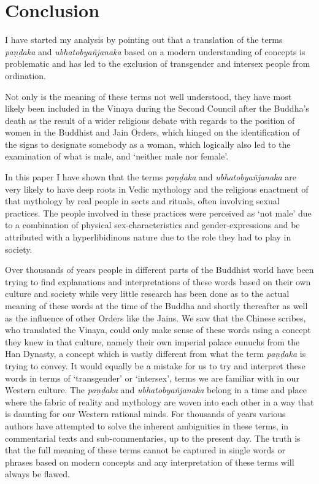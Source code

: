 \section{Conclusion}
I have started my analysis by pointing out that a translation of the terms {\em paṇḍaka} and {\em ubhatob­yañ­janaka} based on a modern understanding of concepts is problematic and has led to the exclusion of transgender and intersex people from ordination.

Not only is the meaning of these terms not well understood, they have most likely been included in the Vinaya during the Second Council after the Buddha's death as the result of a wider religious debate with regards to the position of women in the Buddhist and Jain Orders, which hinged on the identification of the signs to designate somebody as a woman, which logically also led to the examination of what is male, and `neither male nor female'.

In this paper I have shown that the terms {\em paṇḍaka} and {\em ubhatob­yañ­janaka} are very likely to have deep roots in Vedic mythology and the religious enactment of that mythology by real people in sects and rituals, often involving sexual practices. The people involved in these practices were perceived as `not male' due to a combination of physical sex-characteristics and gender-expressions and be attributed with a hyperlibidinous nature due to the role they had to play in society.

Over thousands of years people in different parts of the Buddhist world have been trying to find explanations and interpretations of these words based on their own culture and society while very little research has been done as to the actual meaning of these words at the time of the Buddha and shortly thereafter as well as the influence of other Orders like the Jains. We saw that the Chinese scribes, who translated the Vinaya, could only make sense of these words using a concept they knew in that culture, namely their own imperial palace eunuchs from the Han Dynasty, a concept which is vastly different from what the term {\em paṇḍaka} is trying to convey. It would equally be a mistake for us to try and interpret these words in terms of `transgender' or `intersex', terms we are familiar with in our Western culture. The {\em paṇḍaka} and {\em ubhatob­yañ­janaka} belong in a time and place where the fabric of reality and mythology are woven into each other in a way that is daunting for our Western rational minds. For thousands of years various authors have attempted to solve the inherent ambiguities in these terms, in commentarial texts and sub-commentaries, up to the present day. The truth is that the full meaning of these terms cannot be captured in single words or phrases based on modern concepts and any interpretation of these terms will always be flawed.

